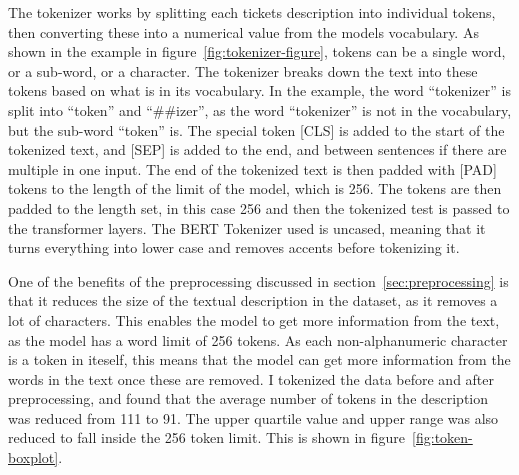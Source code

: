 \documentclass{UoYCSproject}
\begin{document}
    The tokenizer works by splitting each tickets description into individual tokens, then converting these into a numerical value from the models vocabulary.
    As shown in the example in figure~\ref{fig:tokenizer-figure}, tokens can be a single word, or a sub-word, or a character. The tokenizer breaks down the text into these tokens based on what is in its vocabulary.
    In the example, the word ``tokenizer'' is split into ``token'' and ``\#\#izer'', as the word ``tokenizer'' is not in the vocabulary, but the sub-word ``token'' is.
    The special token [CLS] is added to the start of the tokenized text, and [SEP] is added to the end, and between sentences if there are multiple in one input.
    The end of the tokenized text is then padded with [PAD] tokens to the length of the limit of the model, which is 256.
    The tokens are then padded to the length set, in this case 256 and then the tokenized test is passed to the transformer layers.
    The BERT Tokenizer used is uncased, meaning that it turns everything into lower case and removes accents before tokenizing it.
    \par

    One of the benefits of the preprocessing discussed in section~\ref{sec:preprocessing} is that it reduces the size of the textual description in the dataset, as it removes a lot of characters.
    This enables the model to get more information from the text, as the model has a word limit of 256 tokens. As each non-alphanumeric character is a token in iteself, this means that the model can get more information from the words in the text once these are removed.
    I tokenized the data before and after preprocessing, and found that the average number of tokens in the description was reduced from 111 to 91. The upper quartile value and upper range was also reduced to fall inside the 256 token limit.
    This is shown in figure~\ref{fig:token-boxplot}.
\end{document}

